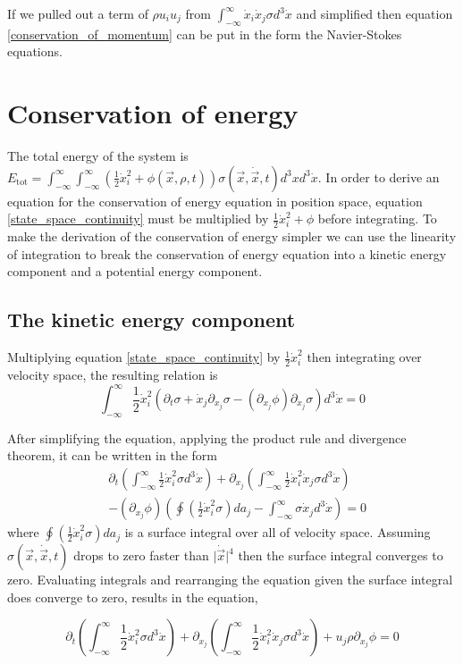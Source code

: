 \documentclass[%
preprint,
 amsmath,amssymb,
 aps,
]{revtex4-1}
\newcommand{\dvec}[1]{\dot{\vec{#1}}}
\newcommand{\intVdot}[1]{\int_{-\infty}^{\infty} #1 d^3\dot{x}}
\newcommand{\intVVdot}[1]{\int_{-\infty}^{\infty}\int_{-\infty}^{\infty} #1 d^3xd^3\dot{x}}
\begin{document}
If we pulled out a term of $\rho u_i u_j$ from $\intVdot{\dot{x}_i\dot{x}_j\sigma}$ and simplified then equation \eqref{conservation_of_momentum} can be put in the form the Navier-Stokes equations.

\section{Conservation of energy}
The total energy of the system is $E_{\text{tot}}=\intVVdot{\left(\frac{1}{2}\dot{x}_i^2 + \phi(\vec{x}, \rho, t)\right)\sigma(\vec{x}, \dvec{x}, t)}$.  In order to derive an equation for the conservation of energy equation in position space, equation \eqref{state_space_continuity} must be multiplied by $\frac{1}{2}\dot{x}_i^2 + \phi$ before integrating. To make the derivation of the conservation of energy simpler we can use the linearity of integration to break the conservation of energy equation into a kinetic energy component and a potential energy component.

\subsection{The kinetic energy component}
Multiplying equation \eqref{state_space_continuity} by $\frac{1}{2}\dot{x}_i^2$ then integrating over velocity space, the resulting relation is
\[
\intVdot{\frac{1}{2}\dot{x}_i^2\left(\partial_t \sigma + \dot{x}_j\partial_{x_j}\sigma-\left(\partial_{x_j}\phi\right)\partial_{\dot{x}_j}\sigma\right)}=0
\]

After simplifying the equation, applying the product rule and divergence theorem, it can be written in the form
\[
\begin{split}
& \partial_t\left(\intVdot{\frac{1}{2}\dot{x}_i^2\sigma}\right) + \partial_{x_j}\left(\intVdot{\frac{1}{2}\dot{x}_i^2\dot{x}_j\sigma}\right) \\ & -  \left(\partial_{x_j}\phi\right)\left(\oint\left(\frac{1}{2}\dot{x}_i^2\sigma\right)da_j - \intVdot{\sigma\dot{x}_j}\right)=0
\end{split}
\]
where $\oint\left(\frac{1}{2}\dot{x}_i^2\sigma\right)da_j$ is a surface integral over all of velocity space. Assuming $\sigma(\vec{x}, \dvec{x}, t)$ drops to zero faster than $\lvert\dvec{x}\rvert^4$ then the surface integral converges to zero. Evaluating integrals and rearranging the equation given the surface integral does converge to zero, results in the equation,

\begin{equation}
\partial_t\left(\intVdot{\frac{1}{2}\dot{x}_i^2\sigma}\right) + \partial_{x_j}\left(\intVdot{\frac{1}{2}\dot{x}_i^2\dot{x}_j\sigma}\right) + u_j\rho\partial_{x_j}\phi=0
\label{incomplete_conservation_of_energy_kinetic}
\end{equation}
\end{document}
